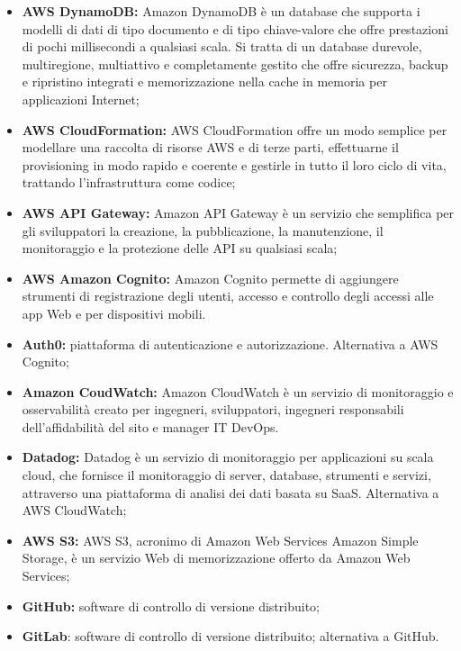 \begin{itemize}
    \item \textbf{AWS DynamoDB:} Amazon DynamoDB è un database che supporta i modelli di dati di tipo documento e di tipo chiave-valore che offre prestazioni di pochi millisecondi a qualsiasi scala. Si tratta di un database durevole, multiregione, multiattivo e completamente gestito che offre sicurezza, backup e ripristino integrati e memorizzazione nella cache in memoria per applicazioni Internet;
    \item \textbf{AWS CloudFormation:} AWS CloudFormation offre un modo semplice per modellare una raccolta di risorse AWS e di terze parti, effettuarne il provisioning in modo rapido e coerente e gestirle in tutto il loro ciclo di vita, trattando l'infrastruttura come codice;
    \item \textbf{AWS API Gateway:} Amazon API Gateway è un servizio che semplifica per gli sviluppatori la creazione, la pubblicazione, la manutenzione, il monitoraggio e la protezione delle API su qualsiasi scala;
    \item \textbf{AWS Amazon Cognito:} Amazon Cognito permette di aggiungere strumenti di registrazione degli utenti, accesso e controllo degli accessi alle app Web e per dispositivi mobili.
    \item \textbf{Auth0:} piattaforma di autenticazione e autorizzazione. Alternativa a AWS Cognito;
    \item \textbf{Amazon CoudWatch:} Amazon CloudWatch è un servizio di monitoraggio e osservabilità creato per ingegneri, sviluppatori, ingegneri responsabili dell'affidabilità del sito e manager IT DevOps.
    \item \textbf{Datadog:} Datadog è un servizio di monitoraggio per applicazioni su scala cloud, che fornisce il monitoraggio di server, database, strumenti e servizi, attraverso una piattaforma di analisi dei dati basata su SaaS. Alternativa a AWS CloudWatch;
    \item \textbf{AWS S3:} AWS S3, acronimo di Amazon Web Services Amazon Simple Storage, è un servizio Web di memorizzazione offerto da Amazon Web Services;
    \item \textbf{GitHub:} software di controllo di versione distribuito; 
    \item \textbf{GitLab}: software di controllo di versione distribuito; alternativa a GitHub.
\end{itemize}

